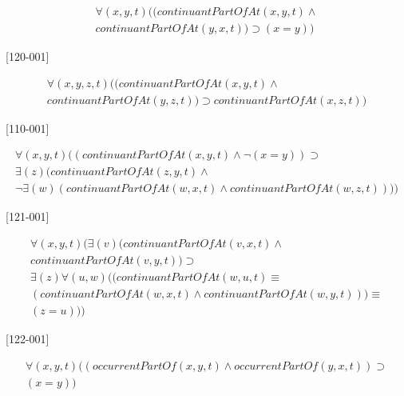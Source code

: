 \documentclass{article}
\begin{document}
\begin{flushright}

\begin{equation}
\begin{split}
{\forall}(x, y, t)((continuantPartOfAt(x, y, t) \wedge \\
continuantPartOfAt(y, x, t)) \supset (x = y))
\end{split}
\end{equation}

[120-001] 

\begin{equation}
\begin{split}
{\forall}(x, y, z, t)((continuantPartOfAt(x, y, t) \wedge \\
continuantPartOfAt(y, z, t)) \supset continuantPartOfAt(x, z, t))
\end{split}
\end{equation}

[110-001] 

\begin{equation}
\begin{split}
{\forall}(x, y, t)((continuantPartOfAt(x, y, t) \wedge {\neg}(x = y)) \supset \\
{\exists}(z)(continuantPartOfAt(z, y, t) \wedge \\
{\neg}{\exists}(w)(continuantPartOfAt(w, x, t) \wedge continuantPartOfAt(w, z, t))))
\end{split}
\end{equation}

[121-001] 

\begin{equation}
\begin{split}
{\forall}(x, y, t)({\exists}(v)(continuantPartOfAt(v, x, t) \wedge \\
continuantPartOfAt(v, y, t)) \supset \\
{\exists}(z){\forall}(u, w)((continuantPartOfAt(w, u, t) \equiv \\
(continuantPartOfAt(w, x, t) \wedge continuantPartOfAt(w, y, t))) \equiv \\
(z = u)))
\end{split}
\end{equation}

[122-001] 

\begin{equation}
\begin{split}
{\forall}(x, y, t)((occurrentPartOf(x, y, t) \wedge occurrentPartOf(y, x, t)) \supset \\
(x = y))
\end{split}
\end{equation}


\end{flushright}
\end{document}

